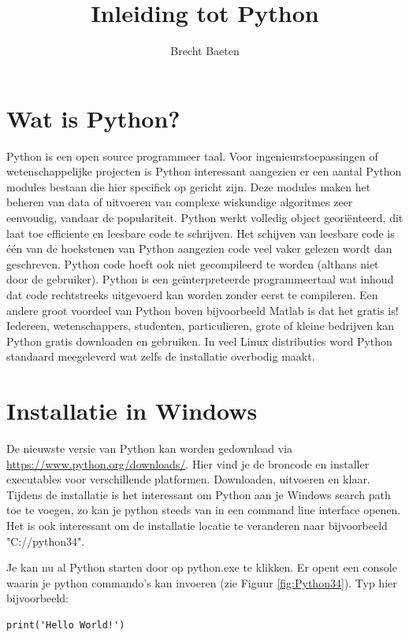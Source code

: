 \documentclass[11pt,twoside]{article}
\title{Inleiding tot Python}
\author{Brecht Baeten}
\begin{document}
	\maketitle

	\section{Wat is Python?}
Python is een open source programmeer taal. Voor ingenieurstoepassingen of wetenschappelijke projecten is Python interessant aangezien er een aantal Python modules bestaan die hier specifiek op gericht zijn. Deze modules maken het beheren van data of uitvoeren van complexe wiskundige algoritmes zeer eenvoudig, vandaar de populariteit. Python werkt volledig object georiënteerd, dit laat toe efficiente en leesbare code te schrijven. Het schijven van leesbare code is één van de hoekstenen van Python aangezien code veel vaker gelezen wordt dan geschreven. Python code hoeft ook niet gecompileerd te worden (althans niet door de gebruiker). Python is een geïnterpreteerde programmeertaal wat inhoud dat code rechtstreeks uitgevoerd kan worden zonder eerst te compileren. Een andere groot voordeel van Python boven bijvoorbeeld Matlab is dat het gratis is! Iedereen, wetenschappers, studenten, particulieren, grote of kleine bedrijven kan Python gratis downloaden en gebruiken. In veel Linux distributies word Python standaard meegeleverd wat zelfs de installatie overbodig maakt.

	\section{Installatie in Windows}
De nieuwste versie van Python kan worden gedownload via \url{https://www.python.org/downloads/}. Hier vind je de broncode en installer executables voor verschillende platformen. Downloaden, uitvoeren en klaar. Tijdens de installatie is het interessant om Python aan je Windows search path toe te voegen, zo kan je python steeds van in een command line interface openen. Het is ook interessant om de installatie locatie te veranderen naar bijvoorbeeld  "\textsf{C://python34}".

Je kan nu al Python starten door op python.exe te klikken. Er opent een console waarin je python commando's kan invoeren (zie Figuur \ref{fig:Python34}). Typ hier bijvoorbeeld:
\begin{lstlisting}
print('Hello World!')
\end{lstlisting}
\end{document}

